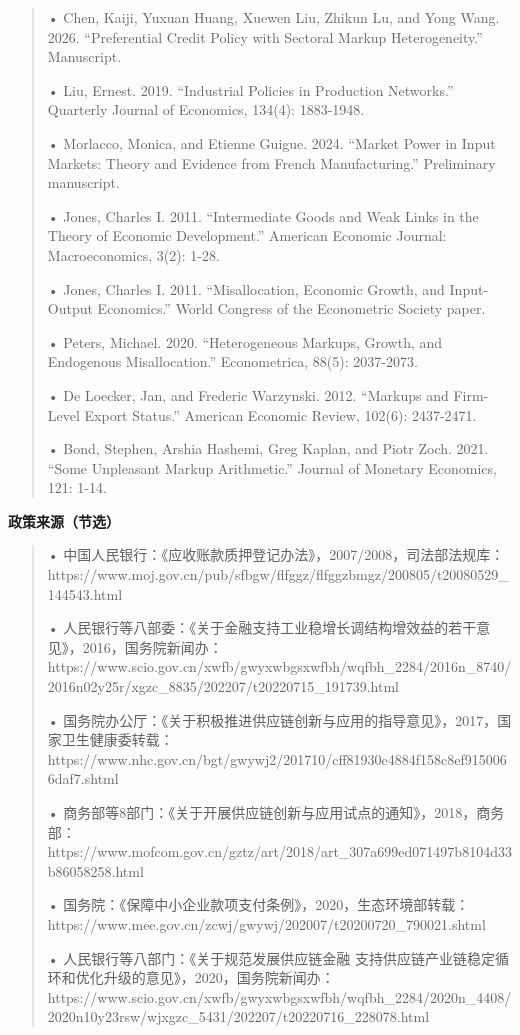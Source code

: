 \documentclass[
  12pt,
]{ctexart}
\begin{document}
\begin{quote}
• Chen, Kaiji, Yuxuan Huang, Xuewen Liu, Zhikun Lu, and Yong Wang. 2026. ``Preferential Credit Policy with Sectoral Markup Heterogeneity.'' Manuscript.

• Liu, Ernest. 2019. ``Industrial Policies in Production Networks.'' Quarterly Journal of Economics, 134(4): 1883-1948.

• Morlacco, Monica, and Etienne Guigue. 2024. ``Market Power in Input Markets: Theory and Evidence from French Manufacturing.'' Preliminary manuscript.

• Jones, Charles I. 2011. ``Intermediate Goods and Weak Links in the Theory of Economic Development.'' American Economic Journal: Macroeconomics, 3(2): 1-28.

• Jones, Charles I. 2011. ``Misallocation, Economic Growth, and Input-Output Economics.'' World Congress of the Econometric Society paper.

• Peters, Michael. 2020. ``Heterogeneous Markups, Growth, and Endogenous Misallocation.'' Econometrica, 88(5): 2037-2073.

• De Loecker, Jan, and Frederic Warzynski. 2012. ``Markups and Firm-Level Export Status.'' American Economic Review, 102(6): 2437-2471.

• Bond, Stephen, Arshia Hashemi, Greg Kaplan, and Piotr Zoch. 2021. ``Some Unpleasant Markup Arithmetic.'' Journal of Monetary Economics, 121: 1-14.
\end{quote}

\textbf{政策来源（节选）}

\begin{quote}
• 中国人民银行：《应收账款质押登记办法》，2007/2008，司法部法规库：https://www.moj.gov.cn/pub/sfbgw/flfggz/flfggzbmgz/200805/t20080529\_144543.html

• 人民银行等八部委：《关于金融支持工业稳增长调结构增效益的若干意见》，2016，国务院新闻办：https://www.scio.gov.cn/xwfb/gwyxwbgsxwfbh/wqfbh\_2284/2016n\_8740/2016n02y25r/xgzc\_8835/202207/t20220715\_191739.html

• 国务院办公厅：《关于积极推进供应链创新与应用的指导意见》，2017，国家卫生健康委转载：https://www.nhc.gov.cn/bgt/gwywj2/201710/cff81930e4884f158c8ef9150066daf7.shtml

• 商务部等8部门：《关于开展供应链创新与应用试点的通知》，2018，商务部：https://www.mofcom.gov.cn/gztz/art/2018/art\_307a699ed071497b8104d33b86058258.html

• 国务院：《保障中小企业款项支付条例》，2020，生态环境部转载：https://www.mee.gov.cn/zcwj/gwywj/202007/t20200720\_790021.shtml

• 人民银行等八部门：《关于规范发展供应链金融 支持供应链产业链稳定循环和优化升级的意见》，2020，国务院新闻办：https://www.scio.gov.cn/xwfb/gwyxwbgsxwfbh/wqfbh\_2284/2020n\_4408/2020n10y23rsw/wjxgzc\_5431/202207/t20220716\_228078.html
\end{quote}
\end{document}
